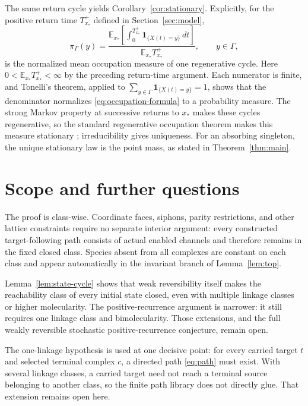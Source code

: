 The same return cycle yields Corollary~\ref{cor:stationary}.  Explicitly, for
the positive return time \(T_{x_*}^+\) defined in Section~\ref{sec:model},
\begin{equation}\label{eq:occupation-formula}
 \pi_\Gamma(y)=
 \frac{\displaystyle
   \mathbb E_{x_*}\!\left[\int_0^{T_{x_*}^+}
      \mathbf1_{\{X(t)=y\}}\,dt\right]}
 {\mathbb E_{x_*}T_{x_*}^+},
 \qquad y\in\Gamma,
\end{equation}
is the normalized mean occupation measure of one regenerative cycle.  Here
\(0<\mathbb E_{x_*}T_{x_*}^+<\infty\) by the preceding return-time argument.
Each numerator is finite, and Tonelli's theorem, applied to
\(\sum_{y\in\Gamma}\mathbf1_{\{X(t)=y\}}=1\), shows that the denominator
normalizes \eqref{eq:occupation-formula} to a probability measure.  The strong
Markov property at successive returns to \(x_*\) makes these cycles
regenerative, so the standard regenerative occupation theorem makes this
measure stationary \citep{Asmussen2003}; irreducibility gives uniqueness.  For
an absorbing singleton, the unique stationary law is the point mass, as stated
in Theorem~\ref{thm:main}.

\section{Scope and further questions}\label{sec:scope}

The proof is class-wise.  Coordinate faces, siphons, parity restrictions, and
other lattice constraints require no separate interior argument: every
constructed target-following path consists of actual enabled channels and
therefore remains in the fixed closed class.  Species absent from all
complexes are constant on each class and appear automatically in the
invariant branch of Lemma~\ref{lem:top}.

Lemma~\ref{lem:state-cycle} shows that weak reversibility itself makes the
reachability class of every initial state closed, even with multiple linkage
classes or higher molecularity.  The positive-recurrence argument is narrower:
it still requires one linkage class and bimolecularity.  Those extensions, and
the full weakly reversible stochastic positive-recurrence conjecture, remain
open.

The one-linkage hypothesis is used at one decisive point: for every carried
target \(t\) and selected terminal complex \(c\), a directed path
\eqref{eq:path} must exist.  With several linkage classes, a carried target
need not reach a terminal source belonging to another class, so the finite
path library does not directly glue.  That extension remains open here.

